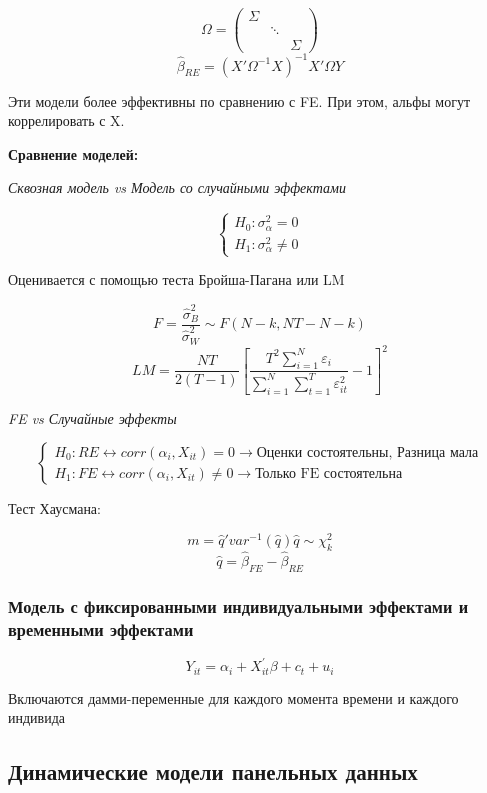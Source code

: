 \documentclass[a4paper, 12pt]{article}
\begin{document}
\[\Omega = \begin{pmatrix}\Sigma & & \\ & \ddots & \\ & & \Sigma\end{pmatrix}\]
\[\hat{\beta}_{RE} = (X'\Omega^{-1}X)^{-1}X'\Omega Y\]

Эти модели более эффективны по сравнению с FE.
При этом, альфы могут коррелировать с X.

\textbf{Сравнение моделей:}

\textit{Сквозная модель vs Модель со случайными эффектами}

\[\begin{cases}
    H_0: \sigma_{\alpha}^2 = 0 \\
    H_1: \sigma_{\alpha}^2 \neq 0
\end{cases}\]

Оценивается с помощью теста Бройша-Пагана или LM

\[F = \frac{\hat{\sigma}_{B}^{2}}{\hat{\sigma}_{W}^{2}} \sim F(N - k, NT - N - k)\]
\[LM = \frac{NT}{2(T - 1)}\left[\frac{T^2\sum_{i = 1}^{N}\varepsilon_{i}}{\sum_{i = 1}^{N}\sum_{t = 1}^{T}\varepsilon_{it}^2} - 1\right]^2\]

\textit{FE vs Случайные эффекты}

\[\begin{cases}
    H_0: RE \leftrightarrow corr(\alpha_i, X_{it}) = 0 \rightarrow \textrm{Оценки состоятельны, Разница мала}\\
    H_1: FE \leftrightarrow corr(\alpha_i, X_{it}) \neq 0 \rightarrow \textrm{Только FE состоятельна}
\end{cases}\]

Тест Хаусмана:

\[m = \hat{q}'var^{-1}(\hat{q})\hat{q} \sim \chi^2_k\]
\[\hat{q} = \hat{\beta}_{FE} - \hat{\beta}_{RE}\]

\subsubsection{Модель с фиксированными индивидуальными эффектами и временными эффектами}

\[Y_{it} = \alpha_i + X_{it}^\prime \beta + c_t + u_i\]

Включаются дамми-переменные для каждого момента времени и
каждого индивида

\subsection{Динамические модели панельных данных}
\end{document}
